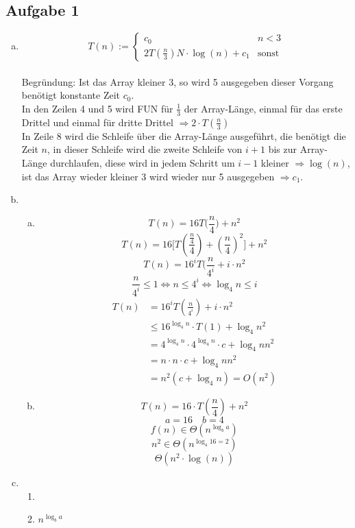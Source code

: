 \documentclass[a4paper,fleqn]{scrartcl}
\begin{document}
\subsection*{Aufgabe 1}
\begin{enumerate}[a)]
 \item
 \[ T(n):= \begin{cases}
    c_0 & n < 3 \\ 
    2T\left( \frac{n}{3} \right) N \cdot \log(n) + c_1 & \text{sonst}
   \end{cases}\] \\
   Begründung: Ist das Array kleiner 3, so wird 5 ausgegeben dieser Vorgang benötigt konstante Zeit $c_0$. \\
   In den Zeilen 4 und 5 wird FUN für $\frac{1}{3}$ der Array-Länge, einmal für das erste Drittel und einmal für dritte Drittel $\Rightarrow 2\cdot T(\frac{n}{3}) $ \\
   In Zeile 8 wird die Schleife über die Array-Länge ausgeführt, die benötigt die Zeit $n$, in dieser Schleife wird die zweite Schleife von $i+1$ bis zur Array-Länge durchlaufen, diese wird in jedem Schritt um $i-1$ kleiner $\Rightarrow \log(n)$, ist das Array wieder kleiner 3 wird wieder nur 5 ausgegeben $\Rightarrow c_1$.
 \item
 \begin{enumerate}[(a)]
  \item \[ T(n) = 16 T\Big(\frac n 4\Big) + n^2 \]
\[ T(n) = 16 \Big[T(\frac {\frac n 4} 4) + (\frac n 4)^2 \Big] + n^2\]
\[ T(n) = 16^i T(\frac n {4^i} + i \cdot n^2\]
\[ \frac n {4^i} \leq 1 \Leftrightarrow n \leq 4^i \Leftrightarrow \log_4 n \leq i \]
\begin{align*}
T(n) &= 16^i T(\frac n {4^i}) + i \cdot n^2\\
     &\leq 16^{\log_4 n} \cdot T(1) + \log_4 n^2\\
     &= 4^{\log_4 n} \cdot 4^{\log_4 n} \cdot c + \log_4 n n^2\\
     &= n \cdot n \cdot c + \log_4 n n^2\\
     &= n^2 (c + \log_4 n) = O(n^2)
\end{align*}
  \item \[ T(n) = 16 \cdot T\left( \frac{n}{4} \right) + n^2 \]
\[ a= 16 \quad b = 4 \]
\[ f(n) \in \Theta \left( n^{\log_b a} \right) \]
\[ n^2 \in \Theta \left( n^{\log_4 16=2} \right) \]
\[ \Theta \left(n^2 \cdot \log(n)\right) \]
 \end{enumerate}

 \item 
 \begin{enumerate}[1.]
  \item 
  \item $ n^{\log_b a} $
 \end{enumerate}

\end{enumerate}
 
\end{document}
